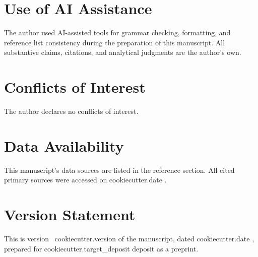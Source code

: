 
\section*{Use of AI Assistance}

The author used AI-assisted tools for grammar checking, formatting, and
reference list consistency during the preparation of this manuscript. All
substantive claims, citations, and analytical judgments are the author's own.

\section*{Conflicts of Interest}

The author declares no conflicts of interest.

\section*{Data Availability}


This manuscript's data sources are listed in the reference section. All cited
primary sources were accessed on {{ cookiecutter.date }}.

\section*{Version Statement}

This is version~{{ cookiecutter.version }} of the manuscript, dated
{{ cookiecutter.date }}, prepared for {{ cookiecutter.target_deposit }}
deposit as a preprint.
